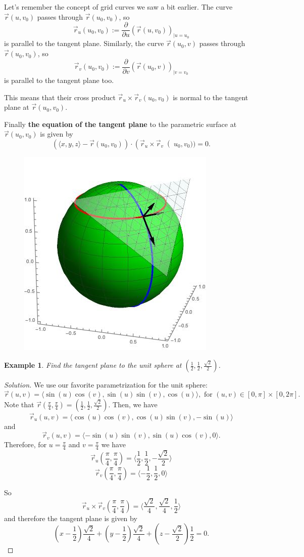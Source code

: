 \documentclass[12pt]{article}
\newcommand{\p}{\partial}
\newcommand{\vr}{\vec{r}{}}
\renewcommand{\lg}{\langle}
\newcommand{\rg}{\rangle}
\newcommand{\rcross}{\vr_u\times\vr_v}
\newenvironment{solution}
  {\begin{proof}[Solution]}
  {\end{proof}
  
  }
\newtheorem{example}{Example}
\begin{document}
Let's remember the concept of grid curves we saw a bit earlier. The curve $\vr(u,v_0)$ passes through $\vr(u_0,v_0)$, so $$\vr_u(u_0,v_0):=\frac{\p}{\p u}\left (\vr(u,v_0)\right )_{|u=u_0}$$ is parallel to the tangent plane. Similarly, the curve $\vr(u_0,v)$ passes through $\vr(u_0,v_0)$, so $$\vr_v(u_0,v_0):=\frac{\p}{\p v}\left (\vr(u_0,v)\right )_{|v=v_0}$$ is parallel to the tangent plane too.

This means that their cross product $\rcross(u_0,v_0)$ is normal to the tangent plane at $\vr(u_0,v_0)$.

Finally \textbf{the equation of the tangent plane } to the parametric surface at $\vr(u_0,v_0)$ is given by $$\left( \lg x,y,z\rg-\vr(u_0,v_0)\right )\cdot\left (\rcross\right(u_0,v_0) )=0.$$

\begin{figure}[h]
\includegraphics[scale=.3]{plane.jpeg}
\end{figure}

\begin{example}
Find the tangent plane to the unit sphere at $(\frac{1}{2},\frac{1}{2},\frac{\sqrt{2}}{2})$.
\end{example}
\begin{solution}
We use our favorite parametrization for the unit sphere:
$$\vr(u,v)=\lg \sin(u)\cos(v),\sin(u)\sin(v),\cos(u)\rg,\text{ for }(u,v)\in[0,\pi]\times[0,2\pi].$$
Note that $\vr(\frac{\pi}{4},\frac{\pi}{4})=(\frac{1}{2},\frac{1}{2},\frac{\sqrt{2}}{2})$.
Then, we have $$\vr_u(u,v)=\lg \cos(u)\cos(v),\cos(u)\sin(v),-\sin(u)\rg$$ and $$\vr_v(u,v)=\lg -\sin(u)\sin(v),\sin(u)\cos(v),0\rg.$$
Therefore, for $u=\frac{\pi}{4}$ and $v=\frac{\pi}{4}$ we have 
$$\vr_u(\frac{\pi}{4},\frac{\pi}{4})=\lg \frac{1}{2},\frac{1}{2},-\frac{\sqrt{2}}{2}\rg$$
$$\vr_v(\frac{\pi}{4},\frac{\pi}{4})=\lg -\frac{1}{2},\frac{1}{2},0\rg$$

So $$\rcross(\frac{\pi}{4},\frac{\pi}{4})=\lg \frac{\sqrt{2}}{4},\frac{\sqrt{2}}{4},\frac{1}{2}\rg$$ and therefore the tangent plane is given by $$(x-\frac{1}{2})\frac{\sqrt{2}}{4}+(y-\frac{1}{2})\frac{\sqrt{2}}{4}+(z-\frac{\sqrt{2}}{2})\frac{1}{2}=0.$$
\end{solution}
\end{document}
